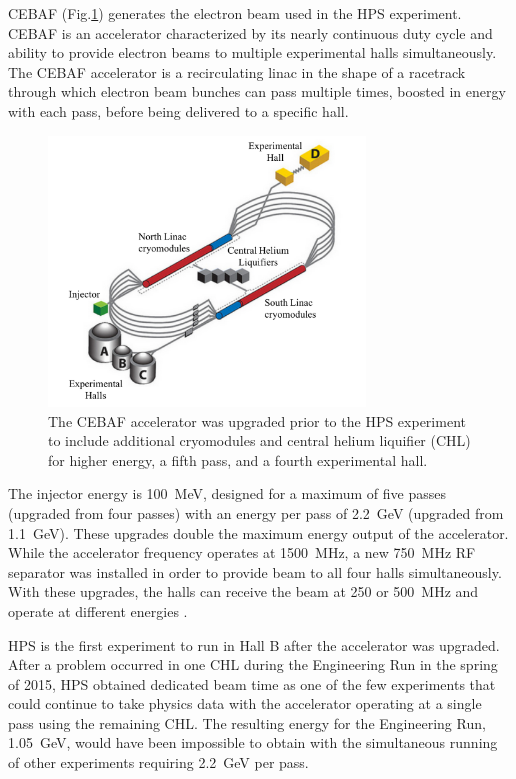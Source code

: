 CEBAF (Fig.\ref{Figure:cebaf}) generates the electron beam used in the HPS experiment. CEBAF is an accelerator characterized by its nearly continuous duty cycle and ability to provide electron beams to multiple experimental halls simultaneously. The CEBAF accelerator is a recirculating linac in the shape of a racetrack through which electron beam bunches can pass multiple times, boosted in energy with each pass, before being delivered to a specific hall. 

\begin{figure}[H]
  \centering
      \includegraphics[width=0.75\textwidth]{pics/experiment/cebafLabel.png}
  \caption[CEBAF accelerator]{The CEBAF accelerator was upgraded prior to the HPS experiment to include additional cryomodules and central helium liquifier (CHL) for higher energy, a fifth pass, and a fourth experimental hall.}
  \label{Figure:cebaf}
\end{figure}

The injector energy is 100~MeV, designed for a maximum of five passes (upgraded from four passes) with an energy per pass of 2.2~GeV (upgraded from 1.1~GeV). These upgrades double the maximum energy output of the accelerator. While the accelerator frequency operates at 1500~MHz, a new 750~MHz RF separator was installed in order to provide beam to all four halls simultaneously. With these upgrades, the halls can receive the beam at 250 or 500~MHz and operate at different energies \cite{Kazimi_2013}. 

HPS is the first experiment to run in Hall B after the accelerator was upgraded. After a problem occurred in one CHL during the Engineering Run in the spring of 2015, HPS obtained dedicated beam time as one of the few experiments that could continue to take physics data with the accelerator operating at a single pass using the remaining CHL. The resulting energy for the Engineering Run, 1.05~GeV, would have been impossible to obtain with the simultaneous running of other experiments requiring 2.2~GeV per pass.  
